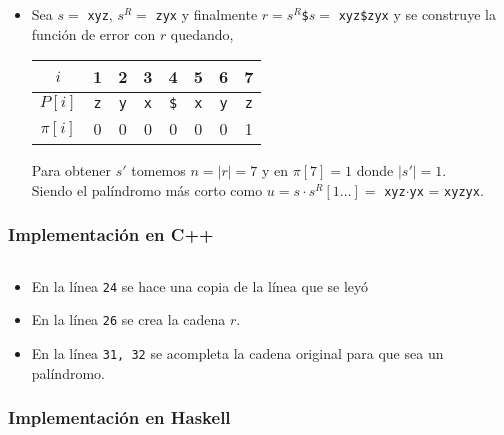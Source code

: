 \begin{itemize}
\item Sea $s = $ \texttt{xyz}, $s^R =$ \texttt{zyx} y finalmente
$r = s^R$\texttt{\$}$s =$ \texttt{xyz\$zyx} y se construye la función de error con $r$ quedando,

\begin{table}[H]
\centering
\begin{tabular}{c|c|c|c|c|c|c|c|}
\cline{2-8}
$i$      & 1          & 2          & 3          & 4           & 5          & 6          & 7          \\ \hline
$P[i]$   & \texttt{z} & \texttt{y} & \texttt{x} & \texttt{\$} & \texttt{x} & \texttt{y} & \texttt{z} \\ \hline
$\pi[i]$ & 0          & 0          & 0          & 0           & 0          & 0          & 1          \\ \cline{2-8} 
\end{tabular}
\end{table}
Para obtener $s'$ tomemos $n = \vert r \vert = 7$ y en $\pi[7] = 1$ donde $\vert s' \vert = 1$.\\
Siendo el palíndromo más corto como
$u = s \cdot s^R[1 \ldots] =$ \texttt{xyz}$\cdot$\texttt{yx} = \texttt{xyzyx}.

\end{itemize}



\subsubsection{Implementación en C++}
\inputminted[linenos, frame=lines]{cpp}{problemas/cpp/EPALIN.cpp}

\begin{itemize}
\item En la línea \texttt{24} se hace una copia de la línea que se leyó
\item En la línea \texttt{26} se crea la cadena $r$.
\item En la línea \texttt{31, 32} se acompleta la cadena original para que sea un palíndromo.
\end{itemize}

\subsubsection{Implementación en Haskell}
\inputminted[linenos, frame=lines]{haskell}{problemas/haskell/EPALIN.hs}

